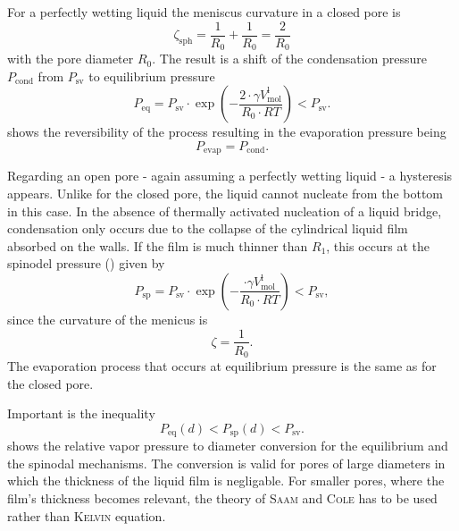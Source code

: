\documentclass[../thesis.tex]{subfiles}
\begin{document}
      For a perfectly wetting liquid the meniscus curvature in a closed pore is
      \begin{equation*}
        \zeta_\mathrm{sph} = \frac{1}{R_0}+\frac{1}{R_0}=\frac{2}{R_0}
      \end{equation*}
      with the pore diameter $R_0$. The result is a shift of the condensation pressure $P_\mathrm{cond}$ from $P_\mathrm{sv}$ to equilibrium pressure
      \begin{equation}
        P_\mathrm{eq}=P_\mathrm{sv}\cdot\exp{\left(-\frac{2\cdot \gamma V_\mathrm{mol}^\mathrm{l}}{R_0\cdot RT}\right)}<P_\mathrm{sv}.
        \label{eq:p-eq}
      \end{equation}
       shows the reversibility of the process resulting in the evaporation pressure being
      \begin{equation*}
        P_\mathrm{evap}=P_\mathrm{cond}.
      \end{equation*}
      \medskip

      

      Regarding an open pore - again assuming a perfectly wetting liquid - a hysteresis appears. Unlike for the closed pore, the liquid cannot nucleate from the bottom in this case. In the absence of thermally activated nucleation of a liquid bridge, condensation only occurs due to the collapse of the cylindrical liquid film absorbed on the walls. If the film is much thinner than $R_1$, this occurs at the spinodel pressure (\cite{Cohan1938a}) given by
      \begin{equation}
        P_\mathrm{sp}=P_\mathrm{sv}\cdot\exp{\left(-\frac{\cdot \gamma V_\mathrm{mol}^\mathrm{l}}{R_0\cdot RT}\right)}<P_\mathrm{sv},
        \label{eq:p-sp}
      \end{equation}
      since the curvature of the menicus is
      \begin{equation*}
        \zeta = \frac{1}{R_0}.
      \end{equation*}
      The evaporation process that occurs at equilibrium pressure is the same as for the closed pore.

      Important is the inequality
      \begin{equation}
        P_\mathrm{eq}(d)<P_\mathrm{sp}(d)<P_\mathrm{sv}.
        \label{eq:cond-pressure-inequality}
      \end{equation}
       shows the relative vapor pressure to diameter conversion for the equilibrium and the spinodal mechanisms. The conversion is valid for pores of large diameters in which the thickness of the liquid film is negligable. For smaller pores, where the film's thickness becomes relevant, the theory of \textsc{Saam} and \textsc{Cole} has to be used rather than \textsc{Kelvin} equation.
\end{document}
